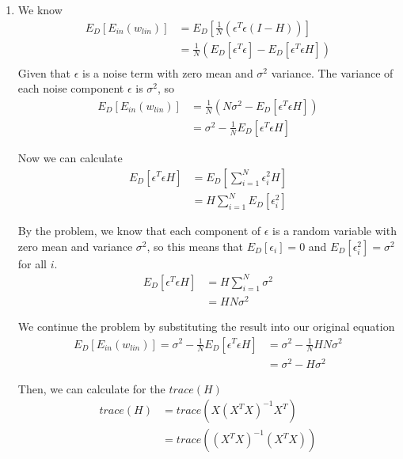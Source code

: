 \documentclass{article}
\begin{document}
\begin{enumerate}
\begin{enumerate}[label=(\alph*)]
            \item We know
            \begin{align*}
                E_D[E_{in}(w_{lin})] &= E_D[\frac{1}{N}(\epsilon^T\epsilon(I - H))]\\
                &= \frac{1}{N} (E_D[\epsilon^T\epsilon] - E_D[\epsilon^T\epsilon H])\\
            \end{align*}
            Given that $\epsilon$ is a noise term with zero mean and $\sigma^2$ variance. The variance of each noise component $\epsilon$ is $\sigma^2$, so 
            \begin{align*}
                E_D[E_{in}(w_{lin})] &= \frac{1}{N}(N\sigma^2 - E_D[\epsilon^T\epsilon H])\\
                &= \sigma^2 - \frac{1}{N}E_D[\epsilon^T\epsilon H]
            \end{align*}
            
            Now we can calculate
            \begin{align*}
                E_D[\epsilon^T\epsilon H] &= E_D[\sum_{i = 1}^{N}\epsilon_i^2 H]\\
                &= H \sum_{i = 1}^{N}E_D[\epsilon_i^2]
            \end{align*}

            By the problem, we know that each component of $\epsilon$ is a random variable with zero mean and variance $\sigma^2$, so this means that $E_D[\epsilon_i] = 0$ and $E_D[\epsilon_i^2] = \sigma^2$ for all $i$.
            \begin{align*}
                E_D[\epsilon^T\epsilon H] &= H\sum_{i = 1}^{N} \sigma^2\\
                &= HN\sigma^2
            \end{align*}

            We continue the problem by substituting the result into our original equation
            \begin{align*}
                E_D[E_{in}(w_{lin})] = \sigma^2 - \frac{1}{N} E_D[\epsilon^T\epsilon H] &= \sigma^2 - \frac{1}{N}HN\sigma^2\\
                &= \sigma^2 - H\sigma^2
            \end{align*}

            Then, we can calculate for the $trace(H)$
            \begin{align*}
                trace(H) &= trace(X(X^T X)^{-1} X^T)\\
                &= trace((X^TX)^{-1}(X^TX))
            \end{align*}


\end{enumerate}
\end{enumerate}
\end{document}
